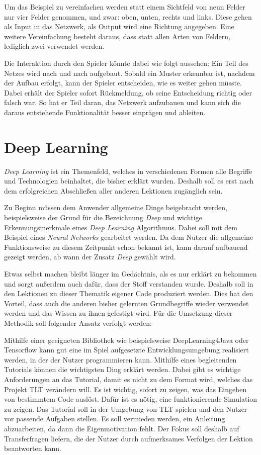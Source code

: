 Um das Beispiel zu vereinfachen werden statt einem Sichtfeld von neun Felder nur vier Felder genommen, und zwar: oben, unten, rechts und links. Diese gehen als Input in das Netzwerk, als Output wird eine Richtung angegeben. Eine weitere Vereinfachung besteht daraus, dass statt allen Arten von Feldern, lediglich zwei verwendet werden. 

Die Interaktion durch den Spieler könnte dabei wie folgt aussehen: Ein Teil des Netzes wird nach und nach aufgebaut. Sobald ein Muster erkennbar ist, nachdem der Aufbau erfolgt, kann der Spieler entscheiden, wie es weiter gehen müsste. Dabei erhält der Spieler sofort Rückmeldung, ob seine Entscheidung richtig oder falsch war. So hat er Teil daran, das Netzwerk aufzubauen und kann sich die daraus entstehende Funktionalität besser einprägen und ableiten.

\section{Deep Learning}

\textit{Deep Learning} ist ein Themenfeld, welches in verschiedenen Formen alle Begriffe und Technologien beinhaltet, die bisher erklärt wurden. Deshalb soll es erst nach dem erfolgreichen Abschließen aller anderen Lektionen zugänglich sein. 

Zu Beginn müssen dem Anwender allgemeine Dinge beigebracht werden, beispielsweise der Grund für die Bezeichnung \textit{Deep} und wichtige Erkennungsmerkmale eines \textit{Deep Learning} Algorithmus. Dabei soll mit dem Beispiel eines \textit{Neural Networks} gearbeitet werden. Da dem Nutzer die allgemeine Funktionsweise zu diesem Zeitpunkt schon bekannt ist, kann darauf aufbauend gezeigt werden, ab wann der Zusatz \textit{Deep} gewählt wird.

Etwas selbst machen bleibt länger im Gedächtnis, als es nur erklärt zu bekommen und sorgt außerdem auch dafür, dass der Stoff verstanden wurde. Deshalb soll in den Lektionen zu dieser Thematik eigener Code produziert werden. Dies hat den Vorteil, dass auch die anderen bisher gelernten Grundbegriffe wieder verwendet werden und das Wissen zu ihnen gefestigt wird. Für die Umsetzung dieser Methodik soll folgender Ansatz verfolgt werden:

Mithilfe einer geeigneten Bibliothek wie beispielsweise DeepLearning4Java oder Tensorflow kann gut eine im Spiel aufgesetzte Entwicklungsumgebung realisiert werden, in der der Nutzer programmieren kann. Mithilfe eines begleitenden Tutorials können die wichtigsten Ding erklärt werden. Dabei gibt es wichtige Anforderungen an das Tutorial, damit es nicht zu dem Format wird, welches das Projekt TLT verändern will. Es ist wichtig, sofort zu zeigen, was das Eingeben von bestimmtem Code auslöst. Dafür ist es nötig, eine funktionierende Simulation zu zeigen. Das Tutorial soll in der Umgebung von TLT spielen und den Nutzer vor passende Aufgaben stellen. Es soll vermieden werden, ein Anleitung abzuarbeiten, da dann die Eigenmotivation fehlt. Der Fokus soll deshalb auf Transferfragen liefern, die der Nutzer durch aufmerksames Verfolgen der Lektion beantworten kann. 

